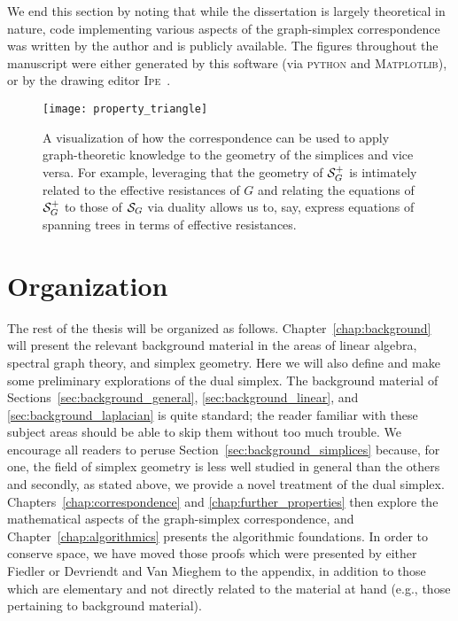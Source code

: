We  end this  section by noting that while the dissertation is largely theoretical  in nature, code implementing various  aspects of the  graph-simplex correspondence was written by the author and is publicly available. %
The figures throughout the manuscript were either generated by this software (via \textsc{python} and \textsc{Matplotlib}),  or by the drawing editor \textsc{Ipe}~\cite{cheong2014ipe}.    

\begin{figure}
	\centering
	\texttt{[image: property\_triangle]}
	\caption{A visualization of how the correspondence can be used to apply graph-theoretic knowledge to the geometry  of the simplices and vice versa. For example, leveraging that the geometry of $\mathcal{S}_G^+$ is intimately related to the effective resistances of $G$ and relating the equations of $\mathcal{S}_G^+$  to those of $\mathcal{S}_G$ via duality allows us  to, say, express equations of spanning trees in terms of effective resistances.  }
	\label{fig:property_triangle}
\end{figure}


\section{Organization}
\label{sec:intro_organization}

The rest of the thesis will be  organized as follows. Chapter~\ref{chap:background} will present the relevant background material in the areas of linear algebra, spectral graph theory, and simplex  geometry. Here we will also define and make some preliminary explorations of the dual simplex. The  background material  of Sections~\ref{sec:background_general}, \ref{sec:background_linear},  and \ref{sec:background_laplacian} is quite standard; the reader familiar with  these subject areas should  be able to skip  them without too much trouble. We  encourage all readers to peruse Section~\ref{sec:background_simplices} because, for one, the field  of simplex geometry is  less  well  studied  in general than the others and secondly, as stated above, we provide a novel treatment of  the dual simplex. Chapters~\ref{chap:correspondence} and \ref{chap:further_properties} then explore the mathematical aspects  of  the graph-simplex correspondence, and Chapter~\ref{chap:algorithmics} presents the algorithmic foundations. In order  to conserve  space, we have moved those proofs which were   presented by either Fiedler or Devriendt and Van Mieghem to the appendix, in addition to those which are elementary and not directly related to the material at  hand (e.g., those pertaining  to background material). 










     

  	
